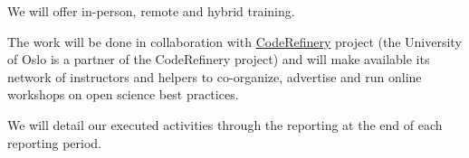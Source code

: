 \begin{task}[
  title=Training Workshops for more reproducible science,
  id=workshops,
  lead=UIO,
  PM=9,
  partners={SRL,MP,IFR}
]
\begin{compactitem}
   \item We will offer in-person, remote and hybrid training.

   \item The work will be done in collaboration with
     \href{https://coderefinery.org}{CodeRefinery} project (the University of Oslo is a partner of the CodeRefinery project) 
     and will make available its network of instructors and helpers
     to co-organize, advertise and run online workshops on open science best practices. 

  \item We will detail our executed activities through the reporting at the end of
    each reporting period.
  \end{compactitem}
\end{task}
